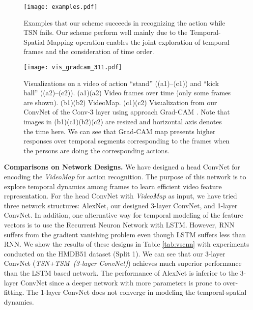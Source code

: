 \documentclass[english, 10pt, twocolumn, twoside]{IEEEtran}
\begin{document}
\begin{figure*}\begin{center}
		\texttt{[image: examples.pdf]}
		\vspace{-3mm}
		\caption{Examples that our scheme succeeds in recognizing the action while TSN \cite{wang2016temporal} fails. Our scheme perform well mainly due to the Temporal-Spatial Mapping operation enables the joint exploration of temporal frames and the consideration of time order.}
		\label{fig:examples}
	\end{center}
\end{figure*}




\begin{figure*}\begin{center}
		\texttt{[image: vis\_gradcam\_311.pdf]}
	\end{center}
\vspace{-3mm}
	\caption{Visualizations on a video of action ``stand'' ((a1)--(c1)) and ``kick ball'' ((a2)--(c2)). (a1)(a2) Video frames over time (only some frames are shown). (b1)(b2) VideoMap. (c1)(c2) Visualization from our ConvNet of the Conv-3 layer using approach Grad-CAM \cite{Selvaraju2016Grad}. Note that images in (b1)(c1)(b2)(c2) are resized and horizontal axis denotes the time here. We can see that Grad-CAM map presents higher responses over temporal segments corresponding to the frames when the persons are doing the corresponding actions.}
\label{fig:visualization}
\end{figure*}

\noindent\textbf{Comparisons on Network Designs.} We have designed a head ConvNet for encoding the \emph{VideoMap} for action recognition. The purpose of this network is to explore temporal dynamics among frames to learn efficient video feature representation. For the head ConvNet with \emph{VideoMap} as input, we have tried three network structures: AlexNet, our designed 3-layer ConvNet, and 1-layer ConvNet. In addition, one alternative way for temporal modeling of the feature vectors is to use the Recurrent Neuron Network with LSTM. However, RNN suffers from the gradient vanishing problem even though LSTM suffers less than RNN. We show the results of these designs in Table \ref{tab:vscnn} with experiments conducted on the HMDB51 dataset (Split 1). We can see that our 3-layer ConvNet (\emph{TSN+TSM~(3-layer ConvNet)}) achieves much superior performance than the LSTM based network. The performance of AlexNet is inferior to the 3-layer ConvNet since a deeper network with more parameters is prone to over-fitting. The 1-layer ConvNet does not converge in modeling the temporal-spatial dynamics.
\end{document}
